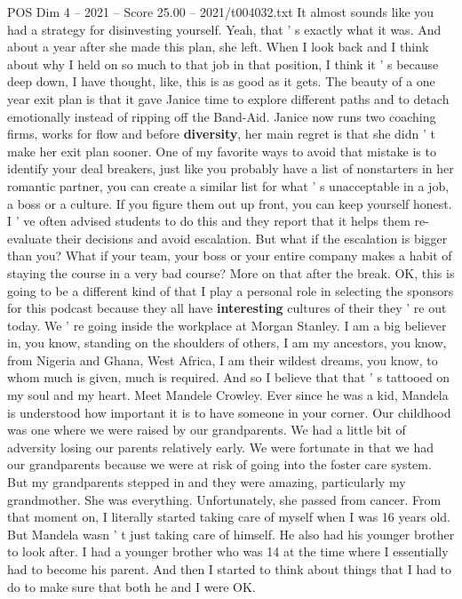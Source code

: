 \begin{textsample}{POS Dim 4 – 2021 – Score 25.00 – 2021/t004032.txt}
It almost sounds like you had a strategy for disinvesting yourself.
Yeah, that ' s exactly what it was.
And about a year after she made this plan, she left.
When I look back and I think about why I held on so much to that job in that position, I think it ' s because deep down, I have thought, like, this is as good as it gets.
The beauty of a one year exit plan is that it gave Janice time to explore different paths and to detach emotionally instead of ripping off the Band-Aid.
Janice now runs two coaching firms, works for flow and before \textbf{diversity}, her main regret is that she didn ' t make her exit plan sooner.
One of my favorite ways to avoid that mistake is to identify your deal breakers, just like you probably have a list of nonstarters in her romantic partner, you can create a similar list for what ' s unacceptable in a job, a boss or a culture.
If you figure them out up front, you can keep yourself honest.
I ' ve often advised students to do this and they report that it helps them re-evaluate their decisions and avoid escalation.
But what if the escalation is bigger than you?
What if your team, your boss or your entire company makes a habit of staying the course in a very bad course?
More on that after the break.
OK, this is going to be a different kind of that I play a personal role in selecting the sponsors for this podcast because they all have \textbf{interesting} cultures of their they ' re out today.
We ' re going inside the workplace at Morgan Stanley.
I am a big believer in, you know, standing on the shoulders of others, I am my ancestors, you know, from Nigeria and Ghana, West Africa, I am their wildest dreams, you know, to whom much is given, much is required.
And so I believe that that ' s tattooed on my soul and my heart.
Meet Mandele Crowley.
Ever since he was a kid, Mandela is understood how important it is to have someone in your corner.
Our childhood was one where we were raised by our grandparents.
We had a little bit of adversity losing our parents relatively early.
We were fortunate in that we had our grandparents because we were at risk of going into the foster care system.
But my grandparents stepped in and they were amazing, particularly my grandmother.
She was everything.
Unfortunately, she passed from cancer.
From that moment on, I literally started taking care of myself when I was 16 years old.
But Mandela wasn ' t just taking care of himself.
He also had his younger brother to look after.
I had a younger brother who was 14 at the time where I essentially had to become his parent.
And then I started to think about things that I had to do to make sure that both he and I were OK.

\end{textsample}
